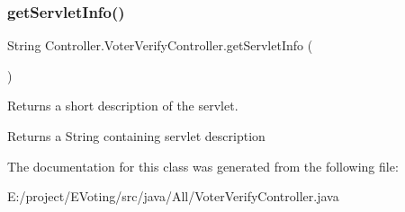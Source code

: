 \subsubsection{\texorpdfstring{getServletInfo()}{getServletInfo()}}
{\footnotesize\ttfamily String Controller.\+Voter\+Verify\+Controller.\+get\+Servlet\+Info (\begin{DoxyParamCaption}{ }\end{DoxyParamCaption})}

Returns a short description of the servlet.

\begin{DoxyReturn}{Returns}
a String containing servlet description 
\end{DoxyReturn}


The documentation for this class was generated from the following file\+:\begin{DoxyCompactItemize}
\item 
E\+:/project/\+E\+Voting/src/java/\+All/Voter\+Verify\+Controller.\+java\end{DoxyCompactItemize}
